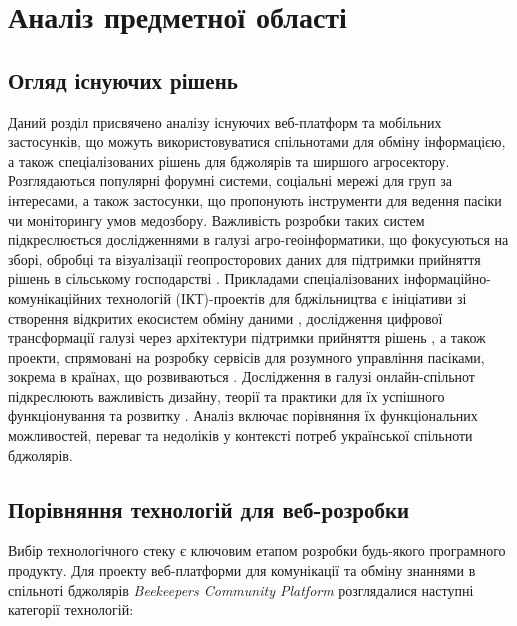 \chapter{Аналіз предметної області}
\label{ch:analysis}

\section{Огляд існуючих рішень}
\label{sec:existing_solutions}
Даний розділ присвячено аналізу існуючих веб-платформ та мобільних застосунків, що можуть використовуватися спільнотами для обміну інформацією, а також спеціалізованих рішень для бджолярів та ширшого агросектору. Розглядаються популярні форумні системи, соціальні мережі для груп за інтересами, а також застосунки, що пропонують інструменти для ведення пасіки чи моніторингу умов медозбору. Важливість розробки таких систем підкреслюється дослідженнями в галузі агро-геоінформатики, що фокусуються на зборі, обробці та візуалізації геопросторових даних для підтримки прийняття рішень в сільському господарстві \cite{granell2015agrogeoinformatics}. Прикладами спеціалізованих інформаційно-комунікаційних технологій (ІКТ)-проектів для бджільництва є ініціативи зі створення відкритих екосистем обміну даними \cite{guruprasad2024beeopen}, дослідження цифрової трансформації галузі через архітектури підтримки прийняття рішень \cite{huet2022digitalbeekeeping}, а також проекти, спрямовані на розробку сервісів для розумного управління пасіками, зокрема в країнах, що розвиваються \cite{wakjira2021sams}. Дослідження в галузі онлайн-спільнот підкреслюють важливість дизайну, теорії та практики для їх успішного функціонування та розвитку \cite{preece2005onlinecommunities}. Аналіз включає порівняння їх функціональних можливостей, переваг та недоліків у контексті потреб української спільноти бджолярів.

\section{Порівняння технологій для веб-розробки}
\label{sec:tech_comparison}
Вибір технологічного стеку є ключовим етапом розробки будь-якого програмного продукту. Для проекту веб-платформи для комунікації та обміну знаннями в спільноті бджолярів \textit{Beekeepers Community Platform} розглядалися наступні категорії технологій:

